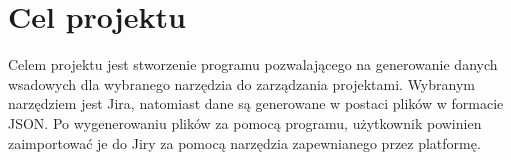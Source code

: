 \section{Cel projektu}
Celem projektu jest stworzenie programu pozwalającego na generowanie danych wsadowych dla wybranego narzędzia do zarządzania projektami.
Wybranym narzędziem jest Jira, natomiast dane są generowane w postaci plików w formacie JSON.
Po wygenerowaniu plików za pomocą programu, użytkownik powinien zaimportować je do Jiry za pomocą narzędzia zapewnianego przez platformę.
